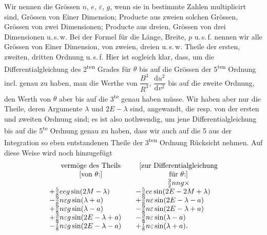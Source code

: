 \clearpage
\begingroup
{}
\renewcommand{\headrulewidth}{0pt}
\par\noindent\hspace*{\parindent}Wir nennen die Grössen \(n\), \(e\), \(\varepsilon\), \(g\), wenn sie in bestimmte Zahlen
multiplicirt sind, Grössen von Einer Dimension; Producte aus zweien solchen
Grössen, Grössen von zwei Dimensionen; Producte aus dreien, Grössen von
drei Dimensionen u.\,s.\,w. Bei der Formel für die Länge, Breite, \(p\) u.\,s.\,f.
nennen wir alle Grössen von Einer Dimension, von zweien, dreien u.\,s.\,w.
Theile der ersten, zweiten, dritten Ordnung u.\,s.\,f. Hier ist sogleich klar,
dass, um die Differentialgleichung des 2\textsuperscript{ten} Grades für \(\theta\) bis auf die Grössen
der 5\textsuperscript{ten} Ordnung incl. genau zu haben, man die Werthe von
\(\dfrac{B^3}{R^3}\), \(\dfrac{\mathrm{d}u^2}{\mathrm{d}v^2}\) bis
auf die zweite Ordnung, den Werth von \(\theta\) aber bis auf die 3\textsuperscript{te} genau haben
müsse. Wir haben aber nur die Theile, deren Argumente \(\lambda\) und \(2E-\lambda\) sind,
angewandt, die resp. von der ersten und zweiten Ordnung sind; es ist also
nothwendig, um jene Differentialgleichung bis auf die 5\textsuperscript{te} Ordnung genau zu
haben, dass wir auch auf die 5 aus der Integration so eben entstandenen
Theile der 3\textsuperscript{ten} Ordnung Rücksicht nehmen. Auf diese Weise wird noch hinzugefügt
\begingroup\small
\setlength{\arraycolsep}{5pt}
\renewcommand{\arraystretch}{1.2}
\[
\begin{array}{l@{\qquad}l}
\multicolumn{1}{c}{\text{vermöge des Theils}}&
\multicolumn{1}{c}{\text{[zur Differentialgleichung}}\\
\multicolumn{1}{c}{\text{[von }\theta\text{:]}}&
\multicolumn{1}{c}{\text{für }\theta\text{:]}}\\
&\multicolumn{1}{c}{\tfrac32nng\times}\\
+\tfrac58eeg\sin(2M-\lambda)&-\tfrac58ee\sin(2E-2M+\lambda)\\
-\tfrac98n\varepsilon g\sin(\lambda+a)&+\tfrac98n\varepsilon\sin(2E-\lambda-a)\\
+\tfrac98n\varepsilon g\sin(\lambda-a)&-\tfrac98n\varepsilon\sin(2E-\lambda+a)\\
+\tfrac38n\varepsilon g\sin(2E-\lambda+a)&-\tfrac38n\varepsilon\sin(\lambda-a)\\
-\tfrac78n\varepsilon g\sin(2E-\lambda-a)&+\tfrac78n\varepsilon\sin(\lambda+a).
\end{array}
\]
\endgroup
